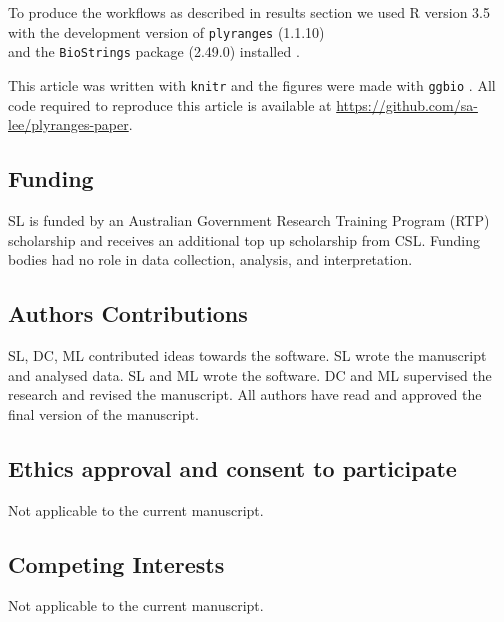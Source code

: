 \documentclass[]{article}
\begin{document}
To produce the workflows as described in results section we used R
version 3.5 with the development version of \texttt{plyranges}
(1.1.10)\\
and the \texttt{BioStrings} package (2.49.0) installed
\cite{r-core, R-plyranges-z, R-biostrings}.

This article was written with \texttt{knitr} \cite{R-knitr} and the
figures were made with \texttt{ggbio} \cite{R-ggbio}. All code required
to reproduce this article is available at
\url{https://github.com/sa-lee/plyranges-paper}.

\hypertarget{funding}{%
\subsection{Funding}\label{funding}}

SL is funded by an Australian Government Research Training Program (RTP)
scholarship and receives an additional top up scholarship from CSL.
Funding bodies had no role in data collection, analysis, and
interpretation.

\hypertarget{authors-contributions}{%
\subsection{Authors Contributions}\label{authors-contributions}}

SL, DC, ML contributed ideas towards the software. SL wrote the
manuscript and analysed data. SL and ML wrote the software. DC and ML
supervised the research and revised the manuscript. All authors have
read and approved the final version of the manuscript.

\hypertarget{ethics-approval-and-consent-to-participate}{%
\subsection{Ethics approval and consent to
participate}\label{ethics-approval-and-consent-to-participate}}

Not applicable to the current manuscript.

\hypertarget{competing-interests}{%
\subsection{Competing Interests}\label{competing-interests}}

Not applicable to the current manuscript.

\newpage
\singlespacing 
\printbibliography[title=References]
\end{document}
